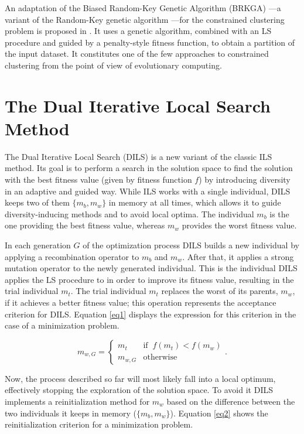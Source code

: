 \documentclass[review]{elsarticle}
\begin{document}
An adaptation of the Biased Random-Key Genetic Algorithm (BRKGA) \cite{gonccalves2011biased}---a variant of the Random-Key genetic algorithm \cite{bean1994genetic}---for the constrained clustering problem is proposed in \cite{de2017comparison}. It uses a genetic algorithm, combined with an LS procedure and guided by a penalty-style fitness function, to obtain a partition of the input dataset. It constitutes one of the few approaches to constrained clustering from the point of view of evolutionary computing.

\clearpage 

\section{The Dual Iterative Local Search Method} \label{sec:DILS}

The Dual Iterative Local Search (DILS) is a new variant of the classic ILS method. Its goal is to perform a search in the solution space to find the solution with the best fitness value (given by fitness function $f$) by introducing diversity in an adaptive and guided way. While ILS works with a single individual, DILS keeps two of them $\{m_b, m_w\}$ in memory at all times, which allows it to guide diversity-inducing methods and to avoid local optima. The individual $m_b$ is the one providing the best fitness value, whereas $m_w$ provides the worst fitness value.

In each generation $G$ of the optimization process DILS builds a new individual by applying a recombination operator to $m_b$ and $m_w$. After that, it applies a strong mutation operator to the newly generated individual. This is the individual DILS applies the LS procedure to in order to improve its fitness value, resulting in the trial individual $m_t$. The trial individual $m_t$ replaces the worst of its parents, $m_w$, if it achieves a better fitness value; this operation represents the acceptance criterion for DILS. Equation \ref{eq1} displays the expression for this criterion in the case of a minimization problem.

\begin{equation}
m_{w,G} = \left\{ \begin{array}{lc}
m_t &   \text{if} \;\; f(m_t) < f(m_w)\\
m_{w,G} &  \text{otherwise}
\end{array}
\right..
\label{eq1}
\end{equation}

Now, the process described so far will most likely fall into a local optimum, effectively stopping the exploration of the solution space. To avoid it DILS implements a reinitialization method for $m_w$ based on the difference between the two individuals it keeps in memory ($\{m_b, m_w\}$). Equation \ref{eq2} shows the reinitialization criterion for a minimization problem.
\end{document}
